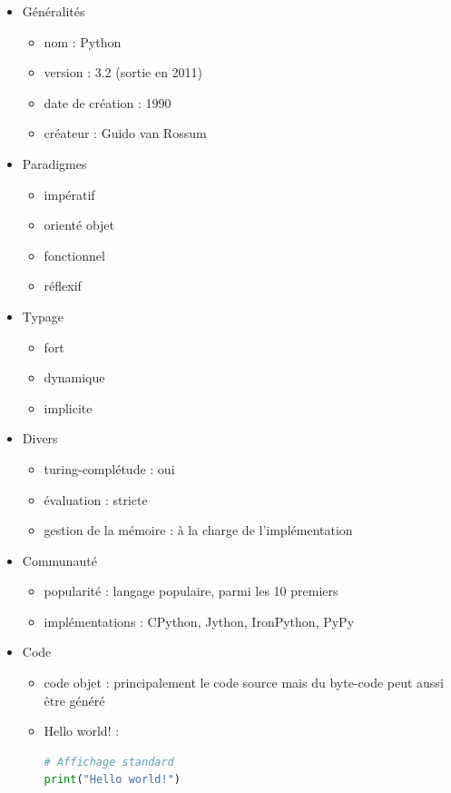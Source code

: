 \renewcommand{\labelitemi}{\textbullet}
\begin{itemize}
\item Généralités
	\begin{itemize}
	\item nom : Python
	\item version : 3.2 (sortie en 2011)
	\item date de création : 1990
	\item créateur : Guido van Rossum\\
	\end{itemize}
\item Paradigmes
	\begin{itemize}
	\item impératif
	\item orienté objet
	\item fonctionnel
	\item réflexif\\
	\end{itemize}
\item Typage
	\begin{itemize}
	\item fort
	\item dynamique
	\item implicite\\
	\end{itemize}
\item Divers
	\begin{itemize}
	\item turing-complétude : oui
	\item évaluation : stricte
	\item gestion de la mémoire : à la charge de l'implémentation\\
	\end{itemize}
\item Communauté
	\begin{itemize}
	\item popularité : langage populaire, parmi les 10 premiers
	\item implémentations : CPython, Jython, IronPython, PyPy\\
	\end{itemize}
\item Code
	\begin{itemize}
	\item code objet : principalement le code source mais du byte-code peut aussi être généré
	\item Hello world! :
\begin{lstlisting}[language=python]
# Affichage standard
print("Hello world!")
\end{lstlisting}
	\end{itemize}
\end{itemize}
